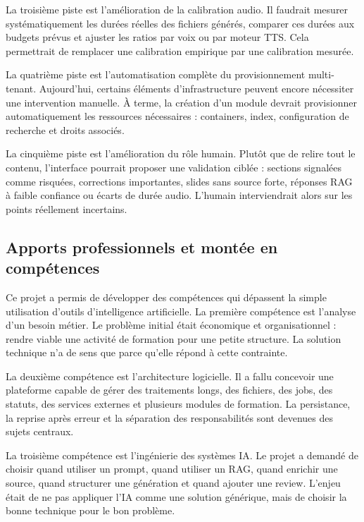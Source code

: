 La troisième piste est l'amélioration de la calibration audio. Il faudrait mesurer
systématiquement les durées réelles des fichiers générés, comparer ces durées aux
budgets prévus et ajuster les ratios par voix ou par moteur TTS. Cela permettrait de
remplacer une calibration empirique par une calibration mesurée.

La quatrième piste est l'automatisation complète du provisionnement multi-tenant.
Aujourd'hui, certains éléments d'infrastructure peuvent encore nécessiter une intervention
manuelle. À terme, la création d'un module devrait provisionner automatiquement les
ressources nécessaires : containers, index, configuration de recherche et droits associés.

La cinquième piste est l'amélioration du rôle humain. Plutôt que de relire tout le contenu,
l'interface pourrait proposer une validation ciblée : sections signalées comme risquées,
corrections importantes, slides sans source forte, réponses RAG à faible confiance ou
écarts de durée audio. L'humain interviendrait alors sur les points réellement incertains.

\subsection{Apports professionnels et montée en compétences}

Ce projet a permis de développer des compétences qui dépassent la simple utilisation
d'outils d'intelligence artificielle. La première compétence est l'analyse d'un besoin métier.
Le problème initial était économique et organisationnel : rendre viable une activité de
formation pour une petite structure. La solution technique n'a de sens que parce qu'elle
répond à cette contrainte.

La deuxième compétence est l'architecture logicielle. Il a fallu concevoir une plateforme
capable de gérer des traitements longs, des fichiers, des jobs, des statuts, des services
externes et plusieurs modules de formation. La persistance, la reprise après erreur et la
séparation des responsabilités sont devenues des sujets centraux.

La troisième compétence est l'ingénierie des systèmes IA. Le projet a demandé de choisir
quand utiliser un prompt, quand utiliser un RAG, quand enrichir une source, quand
structurer une génération et quand ajouter une review. L'enjeu était de ne pas appliquer
l'IA comme une solution générique, mais de choisir la bonne technique pour le bon
problème.

